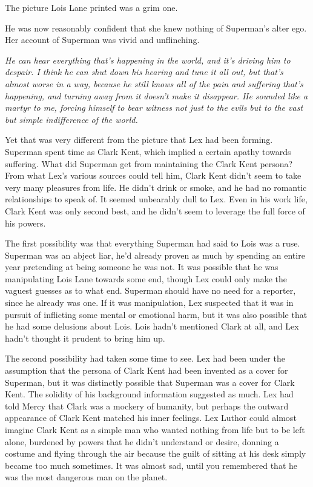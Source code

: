 \documentclass[ebook,12pt]{memoir}
\begin{document}
The picture Lois Lane printed was a grim one.

He was now reasonably confident that she knew nothing of Superman's
alter ego. Her account of Superman was vivid and unflinching.

\emph{He can hear everything that's happening in the world, and it's
driving him to despair. I think he can shut down his hearing and tune it
all out, but that's almost worse in a way, because he still knows all of
the pain and suffering that's happening, and turning away from it
doesn't make it disappear. He sounded like a martyr to me, forcing
himself to bear witness not just to the evils but to the vast but simple
indifference of the world.}

Yet that was very different from the picture that Lex had been forming.
Superman spent time as Clark Kent, which implied a certain apathy
towards suffering. What did Superman get from maintaining the Clark Kent
persona? From what Lex's various sources could tell him, Clark Kent
didn't seem to take very many pleasures from life. He didn't drink or
smoke, and he had no romantic relationships to speak of. It seemed
unbearably dull to Lex. Even in his work life, Clark Kent was only
second best, and he didn't seem to leverage the full force of his
powers.

The first possibility was that everything Superman had said to Lois was
a ruse. Superman was an abject liar, he'd already proven as much by
spending an entire year pretending at being someone he was not. It was
possible that he was manipulating Lois Lane towards some end, though Lex
could only make the vaguest guesses as to what end. Superman should have
no need for a reporter, since he already was one. If it was
manipulation, Lex suspected that it was in pursuit of inflicting some
mental or emotional harm, but it was also possible that he had some
delusions about Lois. Lois hadn't mentioned Clark at all, and Lex hadn't
thought it prudent to bring him up.

The second possibility had taken some time to see. Lex had been under
the assumption that the persona of Clark Kent had been invented as a
cover for Superman, but it was distinctly possible that Superman was a
cover for Clark Kent. The solidity of his background information
suggested as much. Lex had told Mercy that Clark was a mockery of
humanity, but perhaps the outward appearance of Clark Kent matched his
inner feelings. Lex Luthor could almost imagine Clark Kent as a simple
man who wanted nothing from life but to be left alone, burdened by
powers that he didn't understand or desire, donning a costume and flying
through the air because the guilt of sitting at his desk simply became
too much sometimes. It was almost sad, until you remembered that he was
the most dangerous man on the planet.
\end{document}
